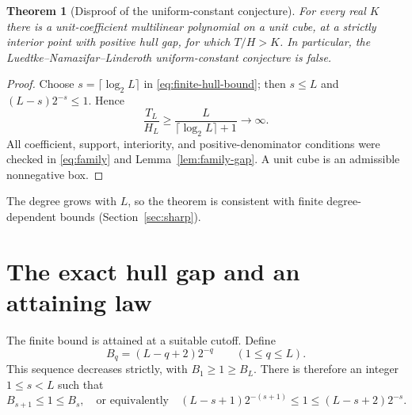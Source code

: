 \documentclass[11pt]{article}
\newtheorem{theorem}{Theorem}
\theoremstyle{remark}
\begin{document}
\begin{theorem}[Disproof of the uniform-constant conjecture]\label{thm:disproof}
For every real $K$ there is a unit-coefficient multilinear polynomial on
a unit cube, at a strictly interior point with positive hull gap, for
which $T/H>K$. In particular, the Luedtke--Namazifar--Linderoth
uniform-constant conjecture is false.
\end{theorem}
\begin{proof}
Choose $s=\lceil\log_2 L\rceil$ in \eqref{eq:finite-hull-bound};
then $s\le L$ and $(L-s)2^{-s}\le1$. Hence
\[
 \frac{T_L}{H_L}\ge\frac{L}{\lceil\log_2 L\rceil+1}\longrightarrow\infty.
\]
All coefficient, support, interiority, and positive-denominator
conditions were checked in \eqref{eq:family} and
Lemma~\ref{lem:family-gap}. A unit cube is an admissible nonnegative box.
\end{proof}

The degree grows with $L$, so the theorem is consistent with finite
degree-dependent bounds (Section~\ref{sec:sharp}).

\section{The exact hull gap and an attaining law}\label{sec:exact}
The finite bound is attained at a suitable cutoff. Define
\[
 B_q=(L-q+2)2^{-q}\qquad(1\le q\le L).
\]
This sequence decreases strictly, with $B_1\ge1\ge B_L$.
There is therefore an integer $1\le s<L$ such that
\begin{equation}\label{eq:cutoff}
 B_{s+1}\le1\le B_s,
 \quad\text{or equivalently}\quad
 (L-s+1)2^{-(s+1)}\le1\le(L-s+2)2^{-s}.
\end{equation}
\end{document}
